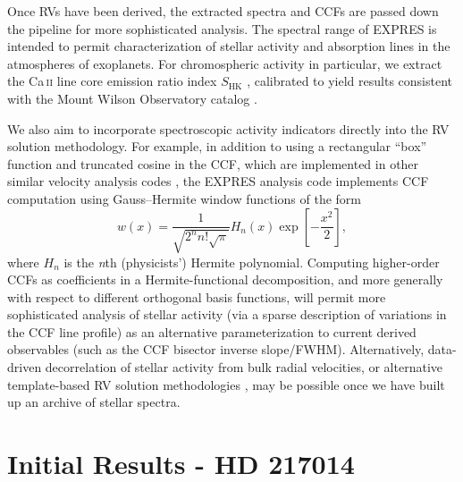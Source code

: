 Once RVs have been derived, the extracted spectra and CCFs are passed down the pipeline for more sophisticated analysis. The spectral range of EXPRES is intended to permit characterization of stellar activity and absorption lines in the atmospheres of exoplanets. For chromospheric activity in particular, we extract the Ca\,\textsc{ii} line core emission ratio index $S_\mathrm{HK}$ \citep[using the parametric model of][]{isaacson_chromospheric_2010}, calibrated to yield results consistent with the Mount Wilson Observatory catalog \citep{duncan_ca_1991}.

We also aim to incorporate spectroscopic activity indicators directly into the RV solution methodology. For example, in addition to using a rectangular ``box'' function and truncated cosine in the CCF, which are implemented in other similar velocity analysis codes \citep[e.g.~][]{freudling_automated_2013, brahm_ceres_2017, modigliani_espresso_2019}, the EXPRES analysis code implements CCF computation using Gauss--Hermite window functions of the form
\begin{equation}w(x) = \frac{1}{\sqrt{2^n n! \sqrt{\pi}}}H_n(x) \exp\left[-\frac{x^2}{2}\right],
\end{equation}
where $H_n$ is the \textit{n}th (physicists') Hermite polynomial. Computing higher-order CCFs as coefficients in a Hermite-functional decomposition, and more generally with respect to different orthogonal basis functions, will permit more sophisticated analysis of stellar activity (via a sparse description of variations in the CCF line profile) as an alternative parameterization to current derived observables (such as the CCF bisector inverse slope/FWHM). Alternatively, data-driven decorrelation of stellar activity from bulk radial velocities, or alternative template-based RV solution methodologies \citep{holzer_hermite-gaussian_2020}, may be possible once we have built up an archive of stellar spectra.

\section{Initial Results - HD 217014}
\label{pipeline:initial-results}

